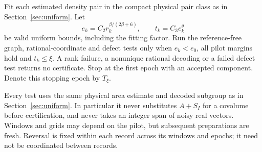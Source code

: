 Fit each estimated density pair in the compact physical pair class as
in Section~\ref{sec:uniform}. Let
\begin{equation}\label{eq:epoch-radii}
 e_k=C_2r_k^{\beta/(2\beta+6)},\qquad
 t_k=C_3e_k^\theta
\end{equation}
be valid uniform bounds, including the fitting factor. Run the
reference-free graph, rational-coordinate and defect tests only when
$e_k<e_0$, all pilot margins hold and $t_k\le\xi$. A rank failure, a
nonunique rational decoding or a failed defect test returns no certificate.
Stop at the first epoch with an accepted component. Denote this stopping
epoch by $T_\xi$.

Every test uses the same physical area estimate and decoded subgroup
as in Section~\ref{sec:uniform}. In particular it never substitutes
$A+S_I$ for a covolume before certification, and never takes an integer
span of noisy real vectors. Windows and grids may depend on the pilot,
but subsequent preparations are fresh. Reversal is fixed within each
record across its windows and epochs; it need not be coordinated between
records.

